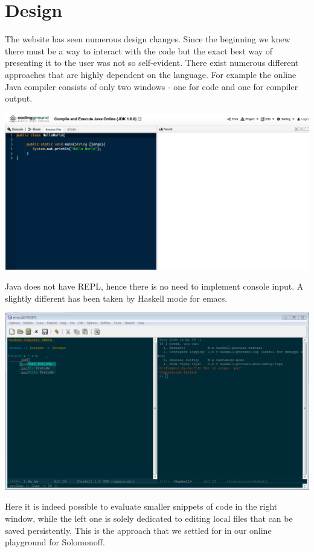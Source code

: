 \section{Design}

The website has seen numerous design changes. Since the beginning we knew there must be a way to interact with the code but the exact best way of presenting it to the user was not so self-evident. There exist numerous different approaches that are highly dependent on the language. For example the online  Java  compiler consists of only two windows - one for code and one for compiler output.
\begin{center}
\includegraphics[scale=0.3]{java.png}
\end{center}
Java does not have REPL, hence there is no need to implement console input.
A slightly different has been taken by Haskell mode for emacs. 
\begin{center}
     \includegraphics[scale=0.45]{haskell.png}
\end{center}
Here it is indeed possible to evaluate smaller snippets of code in the right window, while the left one is solely dedicated to editing local files that can be saved persistently. This is the approach that we settled for in our online playground for Solomonoff. 
